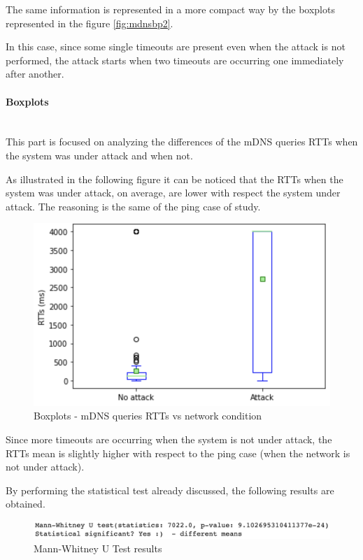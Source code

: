 \documentclass[fleqn, 11pt]{SelfArx} %
\begin{document}
The same information is represented in a more compact way by the boxplots represented in the figure \ref{fig:mdnsbp2}.

In this case, since some single timeouts are present even when the attack is not performed, the attack starts when two timeouts are occurring one immediately after another. 

\paragraph{Boxplots}\mbox{}\\
This part is focused on analyzing the differences of the mDNS queries RTTs when the system was under attack and when not.

As illustrated in the following figure it can be noticed that the RTTs when the system was under attack, on average, are lower with respect the system under attack.
The reasoning is the same of the ping case of study.

\begin{figure}[H]\centering
    \includegraphics[width=\linewidth]{./mdns/mdns-boxplot1.png}
    \caption{Boxplots - mDNS queries RTTs vs network condition}
	\label{fig:mdns-boxplot1}
\end{figure}

Since more timeouts are occurring when the system is not under attack, the RTTs mean is slightly higher with respect to the ping case (when the network is not under attack).

By performing the statistical test already discussed, the following results are obtained.
\begin{figure}[H]\centering
    \includegraphics[width=\linewidth]{./mdns/mannwhitneyu2.png}
    \caption{Mann-Whitney U Test results}
	\label{fig:mannwhitneyu2}
\end{figure}
\end{document}

